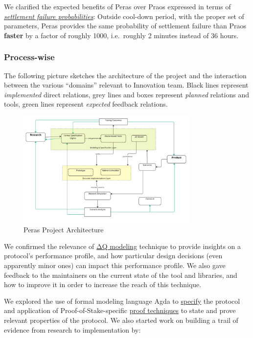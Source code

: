 \documentclass[10pt]{article}
\begin{document}
We clarified the expected benefits of Peras over Praos expressed in
terms of \hyperref[settlement-time]{\emph{settlement failure
probabilities}}: Outside cool-down period, with the proper set of
parameters, Peras provides the same probability of settlement failure
than Praos \textbf{faster} by a factor of roughly 1000, i.e.~roughly 2
minutes instead of 36 hours.

\subsubsection{Process-wise}\label{process-wise}

The following picture sketches the architecture of the project and the
interaction between the various ``domains'' relevant to Innovation team.
Black lines represent \emph{implemented} direct relations, grey lines
and boxes represent \emph{planned} relations and tools, green lines
represent \emph{expected} feedback relations.

\begin{figure}
\centering
\includegraphics[width=0.80\textwidth]{../diagrams/peras-high-level-architecture.jpg}
\caption{Peras Project Architecture}
\end{figure}

We confirmed the relevance of \hyperref[network-performance-analysis]{ΔQ
modeling} technique to provide insights on a protocol's performance
profile, and how particular design decisions (even apparently minor
ones) can impact this performance profile. We also gave feedback to the
maintainers on the current state of the tool and libraries, and how to
improve it in order to increase the reach of this technique.

We explored the use of formal modeling language Agda to
\hyperref[protocol-specification]{specify} the protocol and application
of Proof-of-Stake-specific \hyperref[small-step-semantics]{proof
techniques} to state and prove relevant properties of the protocol. We
also started work on building a trail of evidence from research to
implementation by:
\end{document}
